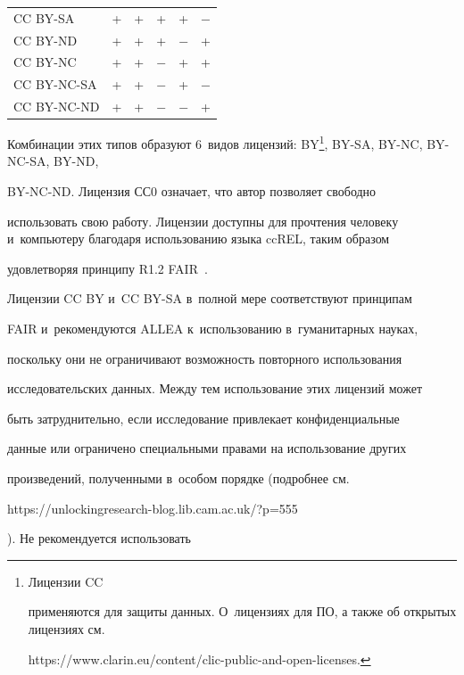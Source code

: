 \begin{table}
\begin{center}
\begin{tabular}{|l|c|c|c|c|c|}
CC BY-SA&+&+&+&+&$-$\\

CC BY-ND&+&+&+&$-$&+\\

CC BY-NC&+&+&$-$&+&+\\

CC BY-NC-SA&+&+&$-$&+&$-$\\

CC BY-NC-ND&+&+&$-$&$-$&+\\

  \hline

  \end{tabular}

  \end{center}

  \vspace*{-6pt}

  \end{table}

  

  Комбинации этих типов образуют 6~видов лицензий: BY\footnote{Лицензии CC 

применяются для защиты данных. О~лицензиях для ПО, а также об открытых лицензиях см.\ {\sf 

https://www.clarin.eu/content/clic-public-and-open-licenses.}}, BY-SA, BY-NC, BY-NC-SA, BY-ND, 

BY-NC-ND. Лицензия СС0 означает, что автор позволяет свободно 

использовать свою работу. Лицензии доступны для прочтения человеку и~компьютеру благодаря использованию языка ccREL, таким образом 

удовлетворяя принципу R1.2 FAIR~\cite{27-nur, 28-nur}.

  

  Лицензии CC BY и~CC BY-SA в~полной мере соответствуют принципам 

FAIR и~рекомендуются ALLEA к~использованию в~гуманитарных науках, 

поскольку они не ограничивают возможность повторного использования 

исследовательских данных. Между тем использование этих лицензий может 

быть затруднительно, если исследование привлекает конфиденциальные 

данные или ограничено специальными правами на использование других 

произведений, полученными в~особом порядке (подробнее см.\ {\sf 

https://unlockingresearch-blog.lib.cam.ac.uk/?p=555}). Не рекомендуется использовать 

